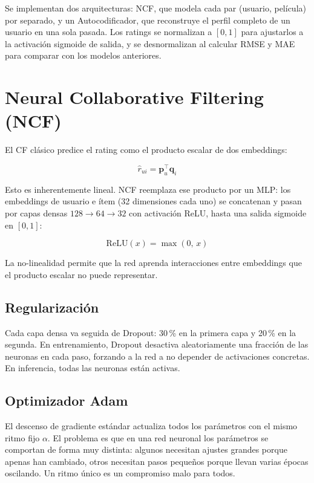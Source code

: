 Se implementan dos arquitecturas: NCF, que modela cada par (usuario, película) por separado, y un Autocodificador, que reconstruye el perfil completo de un usuario en una sola pasada. Los ratings se normalizan a $[0,1]$ para ajustarlos a la activación sigmoide de salida, y se desnormalizan al calcular RMSE y MAE para comparar con los modelos anteriores.

\section{Neural Collaborative Filtering (NCF)}

El CF clásico predice el rating como el producto escalar de dos embeddings:

\begin{equation}
    \hat{r}_{ui} = \mathbf{p}_u^\top \mathbf{q}_i
\end{equation}

Esto es inherentemente lineal. NCF reemplaza ese producto por un MLP: los embeddings de usuario e ítem (32 dimensiones cada uno) se concatenan y pasan por capas densas $128 \to 64 \to 32$ con activación ReLU, hasta una salida sigmoide en $[0,1]$:

\begin{equation}
    \mathrm{ReLU}(x) = \max(0,\, x)
\end{equation}

La no-linealidad permite que la red aprenda interacciones entre embeddings que el producto escalar no puede representar.

\subsection{Regularización}

Cada capa densa va seguida de Dropout: 30\,\% en la primera capa y 20\,\% en la segunda. En entrenamiento, Dropout desactiva aleatoriamente una fracción de las neuronas en cada paso, forzando a la red a no depender de activaciones concretas. En inferencia, todas las neuronas están activas.

\subsection{Optimizador Adam}

El descenso de gradiente estándar actualiza todos los parámetros con el mismo ritmo fijo $\alpha$. El problema es que en una red neuronal los parámetros se comportan de forma muy distinta: algunos necesitan ajustes grandes porque apenas han cambiado, otros necesitan pasos pequeños porque llevan varias épocas oscilando. Un ritmo único es un compromiso malo para todos.


